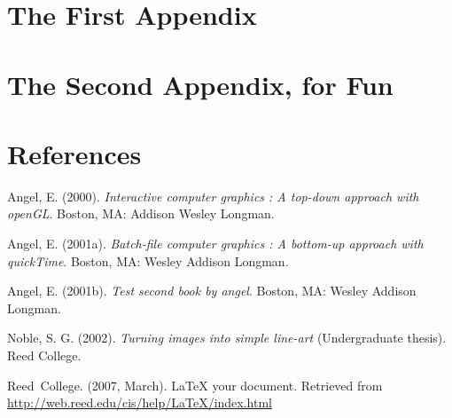 \documentclass[12pt,twoside]{reedthesis}
\begin{document}
  \appendix
  \chapter{The First Appendix} \chapter{The Second Appendix, for Fun}
  
  \backmatter
  
  \chapter{References}
  
  \noindent
  
  \setlength{\parindent}{-0.20in} \setlength{\leftskip}{0.20in}
  \setlength{\parskip}{8pt}
  
  Angel, E. (2000). \emph{Interactive computer graphics : A top-down
  approach with openGL}. Boston, MA: Addison Wesley Longman.
  
  Angel, E. (2001a). \emph{Batch-file computer graphics : A bottom-up
  approach with quickTime}. Boston, MA: Wesley Addison Longman.
  
  Angel, E. (2001b). \emph{Test second book by angel}. Boston, MA: Wesley
  Addison Longman.
  
  Noble, S. G. (2002). \emph{Turning images into simple line-art}
  (Undergraduate thesis). Reed College.
  
  Reed~College. (2007, March). LaTeX your document. Retrieved from
  \url{http://web.reed.edu/cis/help/LaTeX/index.html}


  \chapter{}

\end{document}
